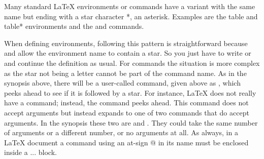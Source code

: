 Many standard {\LaTeX} environments or commands have a variant with the same name but ending with a star character *, an asterisk. Examples are the table and table* environments and the  and  commands.

When defining environments, following this pattern is straightforward because  and  allow the environment name to contain a star. So you just have to write  or  and continue the definition as usual. For commands the situation is more complex as the star not being a letter cannot be part of the command name. As in the synopsis above, there will be a user-called command, given above as , which peeks ahead to see if it is followed by a star. For instance, LaTeX does not really have a  command; instead, the  command peeks ahead. This command does not accept arguments but instead expands to one of two commands that do accept arguments. In the synopsis these two are  and . They could take the same number of arguments or a different number, or no arguments at all. As always, in a LaTeX document a command using an at-sign @ in its name must be enclosed inside a  ...  block.
